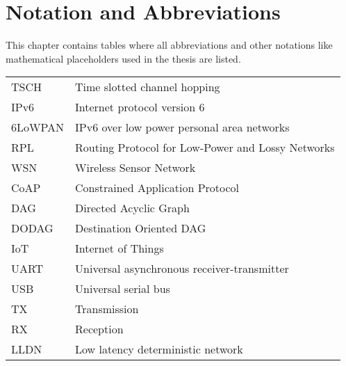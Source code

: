 \chapter{Notation and Abbreviations}
This chapter contains tables where all abbreviations and other notations like mathematical
placeholders used in the thesis are listed.
\begin{table}[h]
\begin{tabular}{ll}
TSCH & Time slotted channel hopping\\
IPv6 & Internet protocol version 6\\
6LoWPAN & IPv6 over low power personal area networks\\
RPL & Routing Protocol for Low-Power and Lossy Networks\\
WSN & Wireless Sensor Network\\
CoAP & Constrained Application Protocol\\
DAG & Directed Acyclic Graph\\
DODAG & Destination Oriented DAG\\
IoT & Internet of Things\\
UART & Universal asynchronous receiver-transmitter\\
USB & Universal serial bus \\
TX & Transmission\\
RX & Reception\\
LLDN & Low latency deterministic network
\end{tabular}
\end{table}

